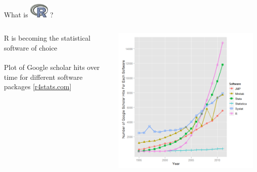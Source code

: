 \documentclass[xcolor=svgnames]{beamer}\usepackage[]{graphicx}\usepackage[]{color}
\begin{document}
\begin{frame}[t]{What is \includegraphics[width=0.07\textwidth]{Rlogo.jpg} \hspace{0.2em}? }
\vspace{-0.1in}
\begin{columns}
\begin{column}{0.4\textwidth}
R is becoming the statistical software of choice\\~\\
Plot of Google scholar hits over time for different software packages
[\href{http://r4stats.com/articles/popularity/}{r4stats.com}]
\end{column}
\begin{column}{0.5\textwidth}
\begin{center}
\includegraphics[width=1.1\textwidth]{r_google.png}
\end{center}
\end{column}
\end{columns}
\end{frame}
\end{document}
